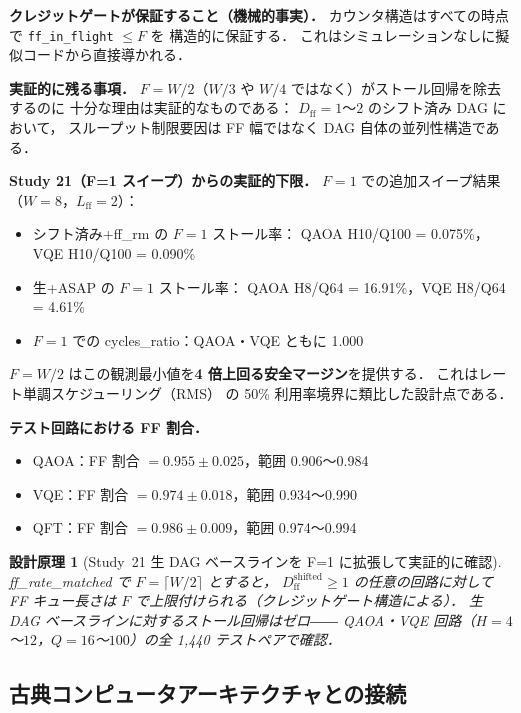 \documentclass[journal,10pt,twocolumn]{IEEEtran}
\newtheorem{principle}{設計原理}
\begin{document}
\textbf{クレジットゲートが保証すること（機械的事実）．}
カウンタ構造はすべての時点で \texttt{ff\_in\_flight} $\leq F$ を
構造的に保証する．
これはシミュレーションなしに擬似コードから直接導かれる．

\textbf{実証的に残る事項．}
$F = W/2$（$W/3$ や $W/4$ ではなく）がストール回帰を除去するのに
十分な理由は実証的なものである：
$D_{\mathrm{ff}} = 1$〜$2$ のシフト済み DAG において，
スループット制限要因は FF 幅ではなく DAG 自体の並列性構造である．

\textbf{Study 21（F=1 スイープ）からの実証的下限．}
$F=1$ での追加スイープ結果（$W=8$，$L_{\mathrm{ff}}=2$）：

\begin{itemize}
\item シフト済み+ff\_rm の $F=1$ ストール率：
  QAOA H10/Q100 = 0.075\%，VQE H10/Q100 = 0.090\%
\item 生+ASAP の $F=1$ ストール率：
  QAOA H8/Q64 = 16.91\%，VQE H8/Q64 = 4.61\%
\item $F=1$ での cycles\_ratio：QAOA・VQE ともに 1.000
\end{itemize}

$F = W/2$ はこの観測最小値を\textbf{4 倍上回る安全マージン}を提供する．
これはレート単調スケジューリング（RMS）\cite{LiuLayland1973} の
50\% 利用率境界に類比した設計点である．

\textbf{テスト回路における FF 割合．}
\begin{itemize}
\item QAOA：FF 割合 $= 0.955 \pm 0.025$，範囲 0.906〜0.984
\item VQE：FF 割合 $= 0.974 \pm 0.018$，範囲 0.934〜0.990
\item QFT：FF 割合 $= 0.986 \pm 0.009$，範囲 0.974〜0.994
\end{itemize}

\begin{principle}[Study~21 生 DAG ベースラインを F=1 に拡張して実証的に確認]
ff\_rate\_matched で $F = \lceil W/2 \rceil$ とすると，
$D_{\mathrm{ff}}^{\mathrm{shifted}} \geq 1$ の任意の回路に対して
FF キュー長さは $F$ で上限付けられる（クレジットゲート構造による）．
生 DAG ベースラインに対するストール回帰はゼロ――
QAOA・VQE 回路（$H=4$〜$12$，$Q=16$〜$100$）の全 1,440 テストペアで確認．
\end{principle}

\subsection{古典コンピュータアーキテクチャとの接続}
\end{document}
